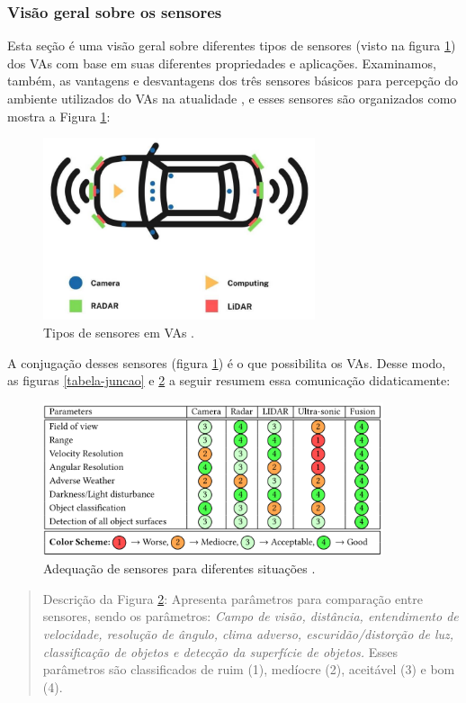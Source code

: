  

\subsubsection{Visão geral sobre os sensores} \label{sensores}

Esta seção é uma visão geral sobre diferentes tipos de sensores (visto na figura \ref{figura-sensores}) dos VAs com base em suas diferentes propriedades e aplicações. Examinamos, também, as vantagens e desvantagens dos três sensores básicos para percepção do ambiente utilizados do VAs na atualidade \cite{sensors}, e esses sensores são organizados como mostra a Figura \ref{figura-sensores}:


\begin{figure}[H]
\centering
\includegraphics[width=8cm]{Figures/sensores.png}
\caption{Tipos de sensores em VAs \cite{review-auto}.}
\label{figura-sensores}
\end{figure}


A conjugação desses sensores (figura \ref{figura-sensores}) é o que possibilita os VAs. Desse modo, as figuras \ref{tabela-juncao} e \ref{all-sense} a seguir resumem essa comunicação didaticamente:

\begin{figure}[H]
\centering
\includegraphics[width=10cm]{Figures/all-sense.png}
\caption{Adequação de sensores para diferentes situações \cite{sensors-yet}.}
\label{all-sense}
\end{figure}
\begin{quote}
Descrição da Figura \ref{all-sense}: Apresenta parâmetros para comparação entre sensores, sendo os parâmetros: \textit{Campo de visão, distância, entendimento de velocidade, resolução de ângulo, clima adverso, escuridão/distorção de luz, classificação de objetos e detecção da superfície de objetos.} Esses parâmetros são classificados de ruim (1), medíocre (2), 
aceitável (3) e bom (4).
\end{quote}

